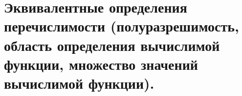 \section{Эквивалентные определения перечислимости (полуразрешимость, область определения вычислимой функции, множество значений вычислимой функции).}